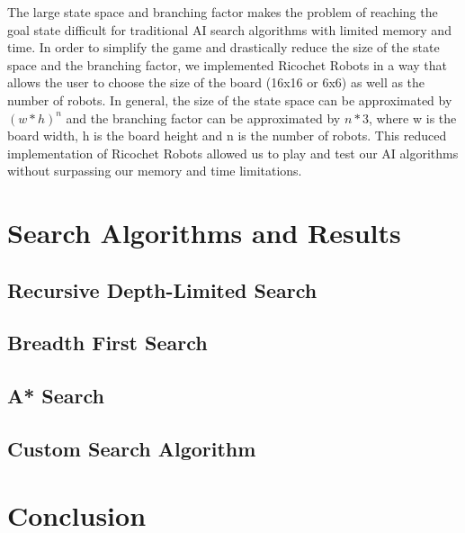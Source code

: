\documentclass[a4paper,10pt]{article}
\begin{document}
The large state space and branching factor makes the problem of reaching the goal state difficult for traditional AI search algorithms with limited memory and time.
In order to simplify the game and drastically reduce the size of the state space and the branching factor, we implemented Ricochet Robots in a way that allows the
user to choose the size of the board (16x16 or 6x6) as well as the number of robots. In general, the size of the state space can be approximated by $(w*h)^n$ and
the branching factor can be approximated by $n*3$, where w is the board width, h is the board height and n is the number of robots.  This reduced implementation
of Ricochet Robots allowed us to play and test our AI algorithms without surpassing our memory and time limitations.


\section{Search Algorithms and Results}


  \subsection{Recursive Depth-Limited Search}


  \subsection{Breadth First Search}


  \subsection{A* Search}


  \subsection{Custom Search Algorithm}


\section{Conclusion}
\end{document}
